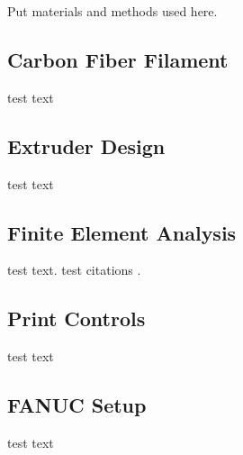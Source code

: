 

Put materials and methods used here.

\subsection*{Carbon Fiber Filament}

test text\\

\subsection*{Extruder Design}

test text\\

\subsection*{Finite Element Analysis}

test text. test citations \cite{Puck-Stuttgard, Puck-NASA}.\\

\subsection*{Print Controls}

test text\\

\subsection*{FANUC Setup}

test text\\